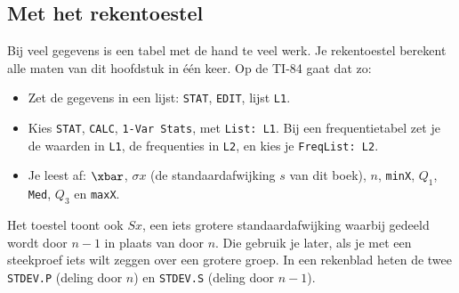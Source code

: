 \subsection{Met het rekentoestel}

Bij veel gegevens is een tabel met de hand te veel werk. Je rekentoestel berekent alle maten van dit hoofdstuk in één keer. Op de TI-84 gaat dat zo:
\begin{itemize}
  \item Zet de gegevens in een lijst: \texttt{STAT}, \texttt{EDIT}, lijst \texttt{L1}.
  \item Kies \texttt{STAT}, \texttt{CALC}, \texttt{1-Var Stats}, met \texttt{List: L1}. Bij een frequentietabel zet je de waarden in \texttt{L1}, de frequenties in \texttt{L2}, en kies je \texttt{FreqList: L2}.
  \item Je leest af: $\xbar$, $\sigma x$ (de standaardafwijking $s$ van dit boek), $n$, \texttt{minX}, $Q_1$, \texttt{Med}, $Q_3$ en \texttt{maxX}.
\end{itemize}

Het toestel toont ook $Sx$, een iets grotere standaardafwijking waarbij gedeeld wordt door $n - 1$ in plaats van door $n$. Die gebruik je later, als je met een steekproef iets wilt zeggen over een grotere groep. In een rekenblad heten de twee \texttt{STDEV.P} (deling door $n$) en \texttt{STDEV.S} (deling door $n - 1$).

